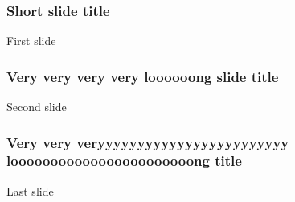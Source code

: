 \documentclass{beamer}
\begin{document}
\begin{frame}
\frametitle{Short slide title}
First slide
\end{frame}
\begin{frame}
\frametitle{Very very very very loooooong slide title}
Second slide
\end{frame}
\begin{frame}
\frametitle{Very very veryyyyyyyyyyyyyyyyyyyyyyyy   looooooooooooooooooooooong title}
Last slide
\end{frame}
\end{document}
